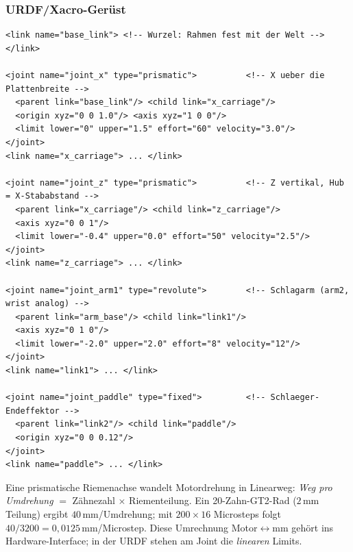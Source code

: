 \subsubsection{URDF/Xacro-Gerüst}
\begin{lstlisting}[style=xml,caption={Gantry + Schlagarm als URDF (gekürzt)}]
<link name="base_link"> <!-- Wurzel: Rahmen fest mit der Welt --> </link>

<joint name="joint_x" type="prismatic">          <!-- X ueber die Plattenbreite -->
  <parent link="base_link"/> <child link="x_carriage"/>
  <origin xyz="0 0 1.0"/> <axis xyz="1 0 0"/>
  <limit lower="0" upper="1.5" effort="60" velocity="3.0"/>
</joint>
<link name="x_carriage"> ... </link>

<joint name="joint_z" type="prismatic">          <!-- Z vertikal, Hub = X-Stababstand -->
  <parent link="x_carriage"/> <child link="z_carriage"/>
  <axis xyz="0 0 1"/>
  <limit lower="-0.4" upper="0.0" effort="50" velocity="2.5"/>
</joint>
<link name="z_carriage"> ... </link>

<joint name="joint_arm1" type="revolute">        <!-- Schlagarm (arm2, wrist analog) -->
  <parent link="arm_base"/> <child link="link1"/>
  <axis xyz="0 1 0"/>
  <limit lower="-2.0" upper="2.0" effort="8" velocity="12"/>
</joint>
<link name="link1"> ... </link>

<joint name="joint_paddle" type="fixed">         <!-- Schlaeger-Endeffektor -->
  <parent link="link2"/> <child link="paddle"/>
  <origin xyz="0 0 0.12"/>
</joint>
<link name="paddle"> ... </link>
\end{lstlisting}
\begin{infobox}[title=Riemenübersetzung der Linearachsen]
Eine prismatische Riemenachse wandelt Motordrehung in Linearweg: \emph{Weg pro
Umdrehung} $=$ Zähnezahl $\times$ Riementeilung. Ein 20-Zahn-GT2-Rad
($2\,$mm Teilung) ergibt $40\,$mm/Umdrehung; mit $200\times16$ Microsteps folgt
$40/3200=0{,}0125\,$mm/Microstep. Diese Umrechnung Motor$\leftrightarrow$mm
gehört ins Hardware-Interface; in der URDF stehen am Joint die \emph{linearen}
Limits.
\end{infobox}

